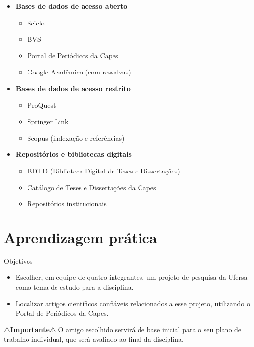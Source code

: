 \documentclass[
  letterpaper,
  DIV=11,
  numbers=noendperiod]{scrreprt}
\providecommand{\tightlist}{%
  \setlength{\itemsep}{0pt}\setlength{\parskip}{0pt}}
\begin{document}
\begin{itemize}
\tightlist
\item
  \textbf{Bases de dados de acesso aberto}

  \begin{itemize}
  \tightlist
  \item
    Scielo
  \item
    BVS
  \item
    Portal de Periódicos da Capes
  \item
    Google Acadêmico (com ressalvas)
  \end{itemize}
\item
  \textbf{Bases de dados de acesso restrito}

  \begin{itemize}
  \tightlist
  \item
    ProQuest
  \item
    Springer Link
  \item
    Scopus (indexação e referências)
  \end{itemize}
\item
  \textbf{Repositórios e bibliotecas digitais}

  \begin{itemize}
  \tightlist
  \item
    BDTD (Biblioteca Digital de Teses e Dissertações)
  \item
    Catálogo de Teses e Dissertações da Capes
  \item
    Repositórios institucionais
  \end{itemize}
\end{itemize}

\section{Aprendizagem prática}\label{aprendizagem-pruxe1tica-7}

Objetivos

\begin{itemize}
\tightlist
\item
  Escolher, em equipe de quatro integrantes, um projeto de pesquisa da
  Ufersa como tema de estudo para a disciplina.
\item
  Localizar artigos científicos confiáveis relacionados a esse projeto,
  utilizando o Portal de Periódicos da Capes.
\end{itemize}

⚠️\textbf{Importante}⚠️ O artigo escolhido servirá de base inicial para
o seu plano de trabalho individual, que será avaliado ao final da
disciplina.
\end{document}
